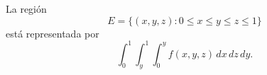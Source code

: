 La región
\[
E=\{(x,y,z):0\leq x\leq y\leq z\leq1\}
\]
está representada por
\[
\int_0^1\int_y^1\int_0^y f(x,y,z)\,dx\,dz\,dy.
\]